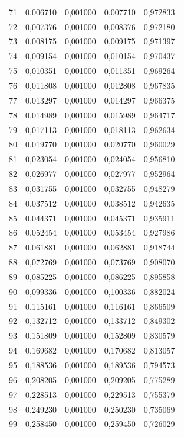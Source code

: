 \begin{small}
\begin{longtable}{rrrrr}
71 & 0,006710 & 0,001000 & 0,007710 & 0,972833 \\
72 & 0,007376 & 0,001000 & 0,008376 & 0,972180 \\
73 & 0,008175 & 0,001000 & 0,009175 & 0,971397 \\
74 & 0,009154 & 0,001000 & 0,010154 & 0,970437 \\
75 & 0,010351 & 0,001000 & 0,011351 & 0,969264 \\
76 & 0,011808 & 0,001000 & 0,012808 & 0,967835 \\
77 & 0,013297 & 0,001000 & 0,014297 & 0,966375 \\
78 & 0,014989 & 0,001000 & 0,015989 & 0,964717 \\
79 & 0,017113 & 0,001000 & 0,018113 & 0,962634 \\
80 & 0,019770 & 0,001000 & 0,020770 & 0,960029 \\
81 & 0,023054 & 0,001000 & 0,024054 & 0,956810 \\
82 & 0,026977 & 0,001000 & 0,027977 & 0,952964 \\
83 & 0,031755 & 0,001000 & 0,032755 & 0,948279 \\
84 & 0,037512 & 0,001000 & 0,038512 & 0,942635 \\
85 & 0,044371 & 0,001000 & 0,045371 & 0,935911 \\
86 & 0,052454 & 0,001000 & 0,053454 & 0,927986 \\
87 & 0,061881 & 0,001000 & 0,062881 & 0,918744 \\
88 & 0,072769 & 0,001000 & 0,073769 & 0,908070 \\
89 & 0,085225 & 0,001000 & 0,086225 & 0,895858 \\
90 & 0,099336 & 0,001000 & 0,100336 & 0,882024 \\
91 & 0,115161 & 0,001000 & 0,116161 & 0,866509 \\
92 & 0,132712 & 0,001000 & 0,133712 & 0,849302 \\
93 & 0,151809 & 0,001000 & 0,152809 & 0,830579 \\
94 & 0,169682 & 0,001000 & 0,170682 & 0,813057 \\
95 & 0,188536 & 0,001000 & 0,189536 & 0,794573 \\
96 & 0,208205 & 0,001000 & 0,209205 & 0,775289 \\
97 & 0,228513 & 0,001000 & 0,229513 & 0,755379 \\
98 & 0,249230 & 0,001000 & 0,250230 & 0,735069 \\
99 & 0,258450 & 0,001000 & 0,259450 & 0,726029 \\

\end{longtable}
\end{small}
